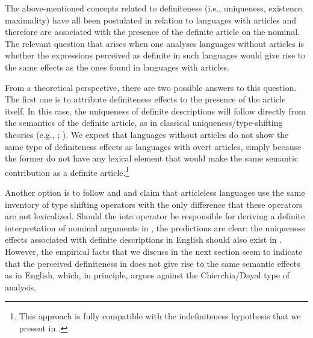 \documentclass[output=paper,
colorlinks,
citecolor=brown,
newtxmath
]{langscibook}
\begin{document}

The above-mentioned concepts related to definiteness (i.e., uniqueness, existence, maximality) have all been postulated in relation to languages with articles and therefore are associated with the presence of the definite article on the nominal. The relevant question that arises when one analyses languages without articles is whether the expressions perceived as definite in such languages would give rise to the same effects as the ones found in languages with articles.

From a theoretical perspective, there are two possible answers to this question. The first one is to attribute definiteness effects to the presence of the article itself. In this case, the uniqueness of definite descriptions will follow directly from the semantics of the definite article, as in classical uniqueness/type-shifting theories (e.g., \citealt{Frege1892}; \citealt{Partee1987}). We expect that languages without articles do not show the same type of definiteness effects as languages with overt articles, simply because the former do not have any lexical element that would make the same semantic contribution as a definite article.\footnote{This approach is fully compatible with the indefiniteness hypothesis that we present in .}

Another option is to follow \citet{Chierchia1998} and \citet{Dayal2004} and claim that articleless languages use the same inventory of type shifting operators with the only difference that these operators are not lexicalized. Should the iota operator be responsible for deriving a definite interpretation of nominal arguments in , the predictions are clear: the uniqueness effects associated with definite descriptions in English should also exist in . However, the empirical facts that we discuss in the next section seem to indicate that the perceived definiteness in  does not give rise to the same semantic effects as in English, which, in principle, argues against the Chierchia/Dayal type of analysis.



\end{document}
